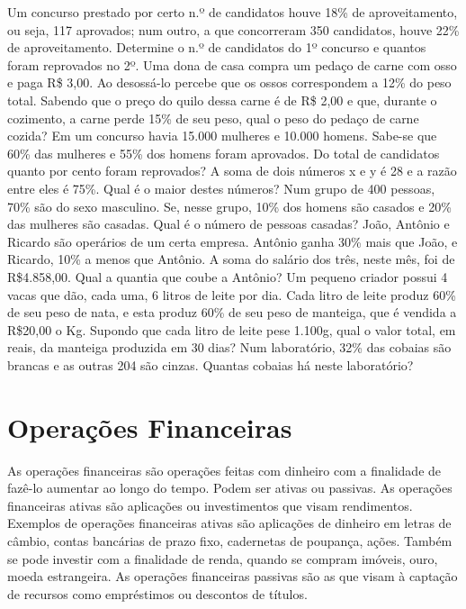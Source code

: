 \begin{exercicios}
    	\exitem{} Um concurso prestado por certo n.º de candidatos houve 18\% de aproveitamento, ou seja, 117 aprovados; num outro, a que concorreram 350 candidatos, houve 22\% de aproveitamento. Determine o n.º de candidatos do 1º concurso e quantos foram reprovados no 2º.
    	\exitem{} Uma dona de casa compra um pedaço de carne com osso e paga R\$ 3,00. Ao desossá-lo percebe que os ossos correspondem a 12\% do peso total. Sabendo que o preço do quilo dessa carne é de R\$ 2,00 e que, durante o cozimento, a carne perde 15\% de seu peso, qual o peso do pedaço de carne  cozida?
        \exitem{} Em um concurso havia 15.000 mulheres e 10.000 homens. Sabe-se que 60\% das mulheres e 55\% dos homens foram aprovados. Do total de candidatos quanto por cento foram reprovados?
        \exitem{} A soma de dois números x e y é 28 e a razão entre eles é 75\%. Qual é o maior destes números?
        \exitem{} Num grupo de 400 pessoas, 70\% são do sexo masculino. Se, nesse grupo, 10\% dos homens são casados e 20\% das mulheres são casadas. Qual é o número de pessoas casadas?
        \exitem{} João, Antônio e Ricardo são operários de um certa empresa. Antônio ganha 30\% mais que João, e Ricardo, 10\% a menos que Antônio. A soma do salário dos três, neste mês, foi de R\$4.858,00. Qual a quantia que coube a Antônio?
        \exitem{} Um pequeno criador possui 4 vacas que dão, cada uma, 6 litros de leite por dia. Cada litro de leite produz 60\% de seu peso de nata, e esta produz 60\% de seu peso de manteiga, que é vendida a R\$20,00 o Kg. Supondo que cada litro de leite pese 1.100g, qual o valor total, em reais, da manteiga produzida em 30 dias?
        \exitem Num laboratório, 32\% das cobaias são brancas e as outras 204 são cinzas. Quantas cobaias há neste laboratório? 
\end{exercicios}

\section{Operações Financeiras}

	As operações financeiras são operações feitas com dinheiro com a finalidade de fazê-lo aumentar ao longo do tempo. Podem ser ativas ou passivas. As operações financeiras ativas são aplicações ou investimentos que visam rendimentos. Exemplos de operações financeiras ativas são aplicações de dinheiro em letras de câmbio, contas bancárias de prazo fixo, cadernetas de poupança, ações. Também se pode investir com a finalidade de renda, quando se compram imóveis, ouro, moeda estrangeira. As operações financeiras passivas são as que visam à captação de recursos como empréstimos ou descontos de títulos. 

